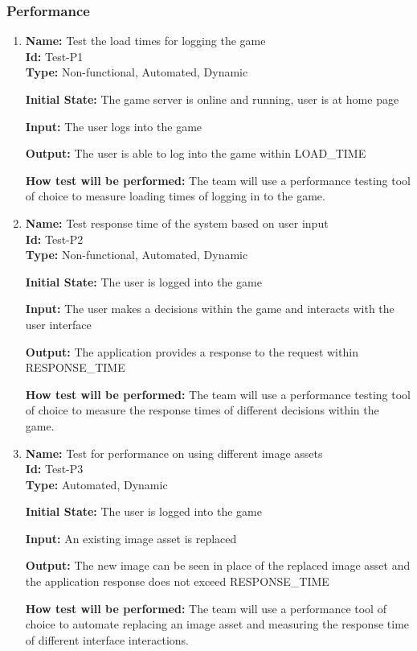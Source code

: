 \documentclass[12pt, titlepage]{article}
\begin{document}
\subsubsection{Performance}
\begin{enumerate}
    \item{\textbf{Name: }Test the load times for logging the game\\}\label{Test-P1}
    \textbf{Id: }Test-P1\\
    
    \textbf{Type:} Non-functional, Automated, Dynamic
    					
    \textbf{Initial State: }The game server is online and running, user is at home page
    					
    \textbf{Input:} The user logs into the game
    					
   \textbf{Output: }The user is able to log into the game within LOAD\_TIME
    					
   \textbf{How test will be performed:} The team will use a performance testing tool of choice to measure loading times of logging in to the game.
    
    
    \item{\textbf{Name: }Test response time of the system based on user input\\}\label{Test-P2}
     \textbf{Id: }Test-P2\\
    
    \textbf{Type: }Non-functional, Automated, Dynamic
    					
    \textbf{Initial State:} The user is logged into the game
    					
    \textbf{Input:} The user makes a decisions within the game and interacts with the user interface
    					
    \textbf{Output:} The application provides a response to the request within RESPONSE\_TIME
    					
    \textbf{How test will be performed:} The team will use a performance testing tool of choice to measure the response times of different decisions within the game.


\item{\textbf{Name:} Test for performance on using different image assets \\}\label{Test-P3}
\textbf{Id: }Test-P3\\

\textbf{Type:} Automated, Dynamic
					
\textbf{Initial State:} The user is logged into the game
					
\textbf{Input: }An existing image asset is replaced
					
\textbf{Output:} The new image can be seen in place of the replaced image asset and the application response does not exceed RESPONSE\_TIME
					
\textbf{How test will be performed: }The team will use a performance tool of choice to automate replacing an image asset and measuring the response time of different interface interactions.
\end{enumerate}
\end{document}
